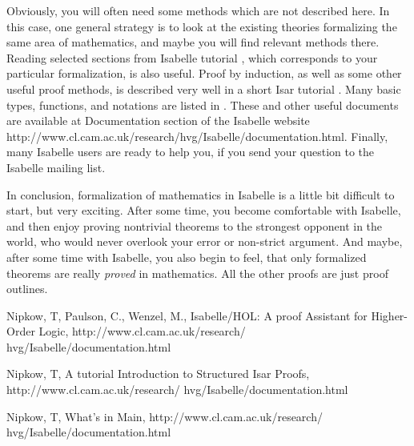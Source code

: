 \documentclass[11pt]{article}
\begin{document}
Obviously, you will often need some methods which are not described here. In this case, one general strategy is to look at the existing theories formalizing the same area of mathematics, and maybe you will find relevant methods there. Reading selected sections from Isabelle tutorial \cite{tutorial}, which corresponds to your particular formalization, is also useful. Proof by induction, as well as some other useful proof methods, is described very well in a short Isar tutorial \cite{isar}. Many basic types, functions, and notations are listed in \cite{main}. These and other useful documents are available at Documentation section of the Isabelle website http://www.cl.cam.ac.uk/research/hvg/Isabelle/documentation.html. Finally, many Isabelle users are ready to help you, if you send your question to the Isabelle mailing list.

In conclusion, formalization of mathematics in Isabelle is a little bit difficult to start, but very exciting. After some time, you become comfortable with Isabelle, and then enjoy proving nontrivial theorems to the strongest opponent in the world, who would never overlook your error or non-strict argument. And maybe, after some time with Isabelle, you also begin to feel, that only formalized theorems are really \emph{proved} in mathematics. All the other proofs are just proof outlines.


\begin{thebibliography}{99}

     Nipkow, T, Paulson, C., Wenzel, M., Isabelle/HOL: A proof Assistant for Higher-Order Logic, http://www.cl.cam.ac.uk/research/
    hvg/Isabelle/documentation.html

     Nipkow, T, A tutorial Introduction to Structured Isar Proofs, http://www.cl.cam.ac.uk/research/ hvg/Isabelle/documentation.html

     Nipkow, T, What's in Main, http://www.cl.cam.ac.uk/research/
    hvg/Isabelle/documentation.html

\end{thebibliography}
\end{document}
